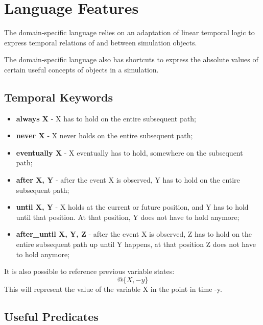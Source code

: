 \documentclass[runningheads]{llncs}
\begin{document}
\section{Language Features}

The domain-specific language relies on an adaptation of linear temporal logic to express temporal relations of and between simulation objects.

The domain-specific language also has shortcuts to express the absolute values of certain useful concepts of objects in a simulation.

\subsection{Temporal Keywords}

\begin{itemize}
\item {\bfseries always X} - X has to hold on the entire subsequent path;
\item {\bfseries never X} - X never holds on the entire subsequent path;
\item {\bfseries eventually X} - X eventually has to hold, somewhere on the subsequent path;
\item {\bfseries after X, Y} - after the event X is observed, Y has to hold on the entire subsequent path;
\item {\bfseries until X, Y} - X holds at the current or future position, and Y has to hold until that position. At that position, Y does not have to hold anymore;
\item {\bfseries after\_until X, Y, Z} - after the event X is observed, Z has to hold on the entire subsequent path up until Y happens, at that position Z does not have to hold anymore;
\end{itemize}

\noindent It is also possible to reference previous variable states:
\begin{equation}
    @\{X, -y\}
\end{equation}
This will represent the value of the variable X in the point in time -y.

\subsection{Useful Predicates}
\end{document}
